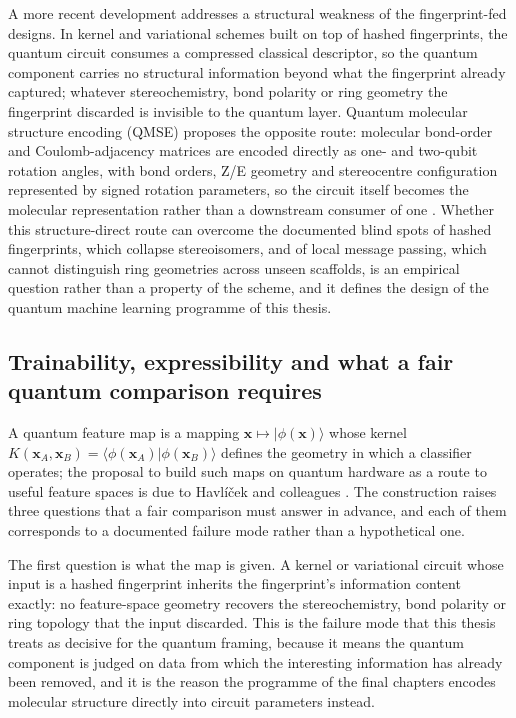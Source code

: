 A more recent development addresses a structural weakness of the fingerprint-fed designs. In kernel and variational schemes built on top of hashed fingerprints, the quantum circuit consumes a compressed classical descriptor, so the quantum component carries no structural information beyond what the fingerprint already captured; whatever stereochemistry, bond polarity or ring geometry the fingerprint discarded is invisible to the quantum layer. Quantum molecular structure encoding (QMSE) proposes the opposite route: molecular bond-order and Coulomb-adjacency matrices are encoded directly as one- and two-qubit rotation angles, with bond orders, Z/E geometry and stereocentre configuration represented by signed rotation parameters, so the circuit itself becomes the molecular representation rather than a downstream consumer of one \cite{Boy2025QMSE}. Whether this structure-direct route can overcome the documented blind spots of hashed fingerprints, which collapse stereoisomers, and of local message passing, which cannot distinguish ring geometries across unseen scaffolds, is an empirical question rather than a property of the scheme, and it defines the design of the quantum machine learning programme of this thesis.

\subsection{Trainability, expressibility and what a fair quantum comparison requires}

A quantum feature map is a mapping $\mathbf{x} \mapsto |\phi(\mathbf{x})\rangle$ whose kernel $K(\mathbf{x}_{A}, \mathbf{x}_{B}) = \langle \phi(\mathbf{x}_{A}) | \phi(\mathbf{x}_{B}) \rangle$ defines the geometry in which a classifier operates; the proposal to build such maps on quantum hardware as a route to useful feature spaces is due to Havl{\'{i}}{\v{c}}ek and colleagues \cite{Havlicek2019}. The construction raises three questions that a fair comparison must answer in advance, and each of them corresponds to a documented failure mode rather than a hypothetical one.

The first question is what the map is given. A kernel or variational circuit whose input is a hashed fingerprint inherits the fingerprint's information content exactly: no feature-space geometry recovers the stereochemistry, bond polarity or ring topology that the input discarded. This is the failure mode that this thesis treats as decisive for the quantum framing, because it means the quantum component is judged on data from which the interesting information has already been removed, and it is the reason the programme of the final chapters encodes molecular structure directly into circuit parameters instead.

